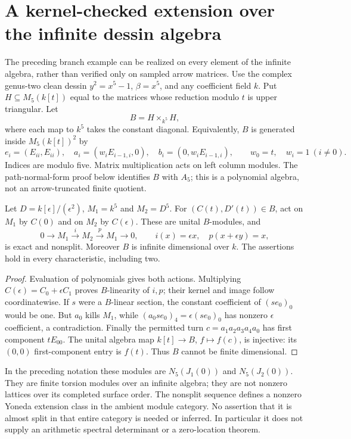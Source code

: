 \section{A kernel-checked extension over the infinite dessin algebra}
\label{bre:core}
The preceding branch example can be realized on every element of the
infinite algebra, rather than verified only on sampled arrow matrices.
Use the complex genus-two clean dessin $y^2=x^5-1$, $\beta=x^5$, and any
coefficient field $k$. Put $H\subseteq M_5(k[t])$ equal to the matrices
whose reduction modulo $t$ is upper triangular. Let
\[
 B=H\mathbin{\times}_{k^5}H,
\]
where each map to $k^5$ takes the constant diagonal. Equivalently, $B$ is
generated inside $M_5(k[t])^2$ by
\[
 e_i=(E_{ii},E_{ii}),\quad
 a_i=(w_iE_{i-1,i},0),\quad b_i=(0,w_iE_{i-1,i}),
 \qquad w_0=t,\quad w_i=1\ (i\ne0).
\]
Indices are modulo five. Matrix multiplication acts on left column
modules. The path-normal-form proof below identifies $B$ with $A_5$;
this is a polynomial algebra, not an arrow-truncated finite quotient.

\begin{theorem}\label{bre:extension}
Let $D=k[\epsilon]/(\epsilon^2)$, $M_1=k^5$ and $M_2=D^5$.
For $(C(t),D'(t))\in B$, act on $M_1$ by $C(0)$ and on $M_2$ by
$C(\epsilon)$. These are unital $B$-modules, and
\[
 0\longrightarrow M_1\xrightarrow{\ i\ }M_2
 \xrightarrow{\ p\ }M_1\longrightarrow0,
 \qquad i(x)=\epsilon x,\quad p(x+\epsilon y)=x,
\]
is exact and nonsplit. Moreover $B$ is infinite dimensional over $k$.
The assertions hold in every characteristic, including two.
\end{theorem}
\begin{proof}
Evaluation of polynomials gives both actions. Multiplying
$C(\epsilon)=C_0+\epsilon C_1$ proves $B$-linearity of $i,p$;
their kernel and image follow coordinatewise. If $s$ were a $B$-linear
section, the constant coefficient of $(s e_0)_0$ would be one. But $a_0$ kills
$M_1$, while $(a_0s e_0)_4=\epsilon(s e_0)_0$ has nonzero
$\epsilon$ coefficient, a contradiction. Finally the permitted turn
$c=a_1a_2a_3a_4a_0$ has first component $tE_{00}$.
The unital algebra map $k[t]\to B$, $f\mapsto f(c)$, is injective:
its $(0,0)$ first-component entry is $f(t)$. Thus $B$ cannot be
finite dimensional.
\end{proof}

In the preceding notation these modules are $N_5(J_1(0))$ and
$N_5(J_2(0))$. They are finite torsion modules over an infinite algebra;
they are not nonzero lattices over its completed surface order. The
nonsplit sequence defines a nonzero Yoneda extension class in the ambient
module category. No assertion that it is almost split in that entire
category is needed or inferred. In particular it does not supply an
arithmetic spectral determinant or a zero-location theorem.



